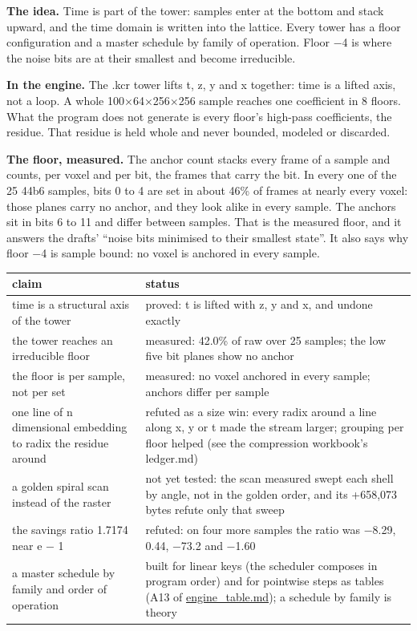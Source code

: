 \textbf{The idea.} Time is part of the tower: samples enter at the bottom and stack upward, and the time domain is written into the lattice. Every tower has a floor configuration and a master schedule by family of operation. Floor −4 is where the noise bits are at their smallest and become irreducible.

\textbf{In the engine.} The .kcr tower lifts t, z, y and x together: time is a lifted axis, not a loop. A whole 100×64×256×256 sample reaches one coefficient in 8 floors. What the program does not generate is every floor's high-pass coefficients, the residue. That residue is held whole and never bounded, modeled or discarded.

\textbf{The floor, measured.} The anchor count stacks every frame of a sample and counts, per voxel and per bit, the frames that carry the bit. In every one of the 25 44b6 samples, bits 0 to 4 are set in about 46\% of frames at nearly every voxel: those planes carry no anchor, and they look alike in every sample. The anchors sit in bits 6 to 11 and differ between samples. That is the measured floor, and it answers the drafts' “noise bits minimised to their smallest state”. It also says why floor −4 is sample bound: no voxel is anchored in every sample.

{\small
\setlength{\tabcolsep}{6pt}
\begin{longtable}{>{\RaggedRight\arraybackslash}p{}>{\RaggedRight\arraybackslash}p{}}
\toprule
claim & status \\
\midrule
\endhead
time is a structural axis of the tower & proved: t is lifted with z, y and x, and undone exactly \\
the tower reaches an irreducible floor & measured: 42.0\% of raw over 25 samples; the low five bit planes show no anchor \\
the floor is per sample, not per set & measured: no voxel anchored in every sample; anchors differ per sample \\
one line of n dimensional embedding to radix the residue around & refuted as a size win: every radix around a line along x, y or t made the stream larger; grouping per floor helped (see the compression workbook's ledger.md) \\
a golden spiral scan instead of the raster & not yet tested: the scan measured swept each shell by angle, not in the golden order, and its +658,073 bytes refute only that sweep \\
the savings ratio 1.7174 near e − 1 & refuted: on four more samples the ratio was −8.29, 0.44, −73.2 and −1.60 \\
a master schedule by family and order of operation & built for linear keys (the scheduler composes in program order) and for pointwise steps as tables (A13 of \hyperref[chap:engine-table]{engine\_\allowbreak{}table.md}); a schedule by family is theory \\
\bottomrule
\end{longtable}
}

